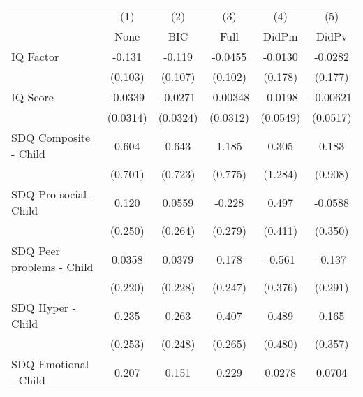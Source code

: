 {
\def\sym#1{\ifmmode^{#1}\else\(^{#1}\)\fi}
\begin{tabular}{l*{5}{c}}
\toprule
            &\multicolumn{1}{c}{(1)}&\multicolumn{1}{c}{(2)}&\multicolumn{1}{c}{(3)}&\multicolumn{1}{c}{(4)}&\multicolumn{1}{c}{(5)}\\
            &\multicolumn{1}{c}{None}&\multicolumn{1}{c}{BIC}&\multicolumn{1}{c}{Full}&\multicolumn{1}{c}{DidPm}&\multicolumn{1}{c}{DidPv}\\
\midrule
IQ Factor   &      -0.131         &      -0.119         &     -0.0455         &     -0.0130         &     -0.0282         \\
            &     (0.103)         &     (0.107)         &     (0.102)         &     (0.178)         &     (0.177)         \\
\addlinespace
IQ Score    &     -0.0339         &     -0.0271         &    -0.00348         &     -0.0198         &    -0.00621         \\
            &    (0.0314)         &    (0.0324)         &    (0.0312)         &    (0.0549)         &    (0.0517)         \\
\addlinespace
SDQ Composite - Child&       0.604         &       0.643         &       1.185         &       0.305         &       0.183         \\
            &     (0.701)         &     (0.723)         &     (0.775)         &     (1.284)         &     (0.908)         \\
\addlinespace
SDQ Pro-social - Child&       0.120         &      0.0559         &      -0.228         &       0.497         &     -0.0588         \\
            &     (0.250)         &     (0.264)         &     (0.279)         &     (0.411)         &     (0.350)         \\
\addlinespace
SDQ Peer problems - Child&      0.0358         &      0.0379         &       0.178         &      -0.561         &      -0.137         \\
            &     (0.220)         &     (0.228)         &     (0.247)         &     (0.376)         &     (0.291)         \\
\addlinespace
SDQ Hyper - Child&       0.235         &       0.263         &       0.407         &       0.489         &       0.165         \\
            &     (0.253)         &     (0.248)         &     (0.265)         &     (0.480)         &     (0.357)         \\
\addlinespace
SDQ Emotional - Child&       0.207         &       0.151         &       0.229         &      0.0278         &      0.0704         \\

\end{tabular}}
